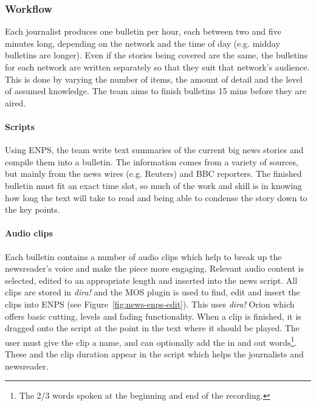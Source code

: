 \subsubsection{Workflow}
Each journalist produces one bulletin per hour, each between two and five minutes long, depending on the network and
the time of day (e.g. midday bulletins are longer). Even if the stories being covered are the same, the bulletins for
each network are written separately so that they suit that network's audience. This is done by varying the number of
items, the amount of detail and the level of assumed knowledge. The team aims to finish bulletins 15 mins before they
are aired.

\paragraph{Scripts}
Using ENPS, the team write text summaries of the current big news stories and compile them into a bulletin. The
information comes from a variety of sources, but mainly from the news wires (e.g. Reuters) and BBC reporters.  The
finished bulletin must fit an exact time slot, so much of the work and skill is in knowing how long the text will take
to read and being able to condense the story down to the key points. 

\paragraph{Audio clips}\label{sec:news-clips}
Each bulletin contains a number of audio clips which help to break up the newsreader's voice and make the piece more
engaging.  Relevant audio content is selected, edited to an appropriate length and inserted into the news script.  All
clips are stored in \textit{dira!} and the MOS plugin is used to find, edit and insert the clips into ENPS (see
Figure~\ref{fig:news-enps-edit}).  This uses \textit{dira!} Orion which offers basic cutting, levels and fading
functionality. When a clip is finished, it is dragged onto the script at the point in the text where it should be
played. The user must give the clip a name, and can optionally add the in and out words\footnote{The 2/3 words spoken
  at the beginning and end of the recording.}. These and the clip duration appear in the script which helps the
journalists and newsreader.

